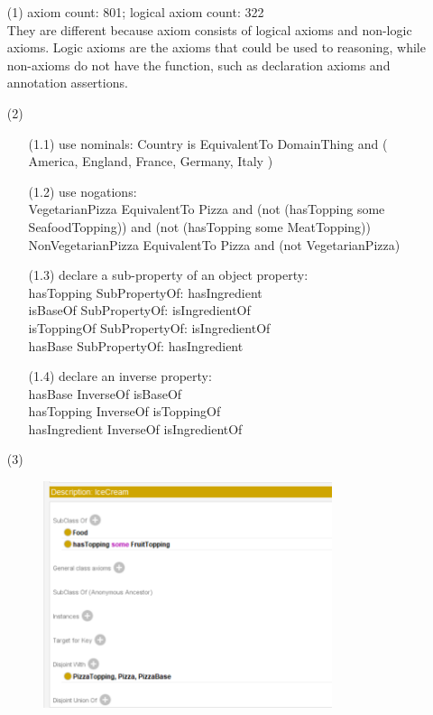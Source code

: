 \documentclass[12pt]{article}
\begin{document}
    \begin{enumerate}
        \item[(1)]
        axiom count: 801; logical axiom count: 322 \\
        They are different because axiom consists of logical axioms and non-logic axioms. Logic axioms are the axioms that could be used to reasoning, while non-axioms do not have
        the function, such as declaration axioms and annotation assertions.
        \item[(2)]
        \begin{enumerate}
            \item[(1.1)]
            use nominals: Country is EquivalentTo DomainThing and ({ America, England, France, Germany, Italy })
            \item[(1.2)]
            use nogations: \\ VegetarianPizza EquivalentTo Pizza and (not (hasTopping some SeafoodTopping)) and (not (hasTopping
some MeatTopping)) \\
            NonVegetarianPizza EquivalentTo Pizza and (not VegetarianPizza) \\
            \item[(1.3)]
            declare a sub-property of an object property:\\
            hasTopping SubPropertyOf: hasIngredient \\
            isBaseOf SubPropertyOf: isIngredientOf \\
            isToppingOf SubPropertyOf: isIngredientOf \\
            hasBase SubPropertyOf: hasIngredient \\
            \item[(1.4)]
            declare an inverse property: \\
            hasBase InverseOf isBaseOf \\
            hasTopping InverseOf isToppingOf \\
            hasIngredient InverseOf isIngredientOf \\
        \end{enumerate} 
        \item[(3)]
        \begin{figure}[h]
			\centering
			\includegraphics[width=0.8\textwidth]{13_3.png}\\

\end{figure}
\end{enumerate}
\end{document}
